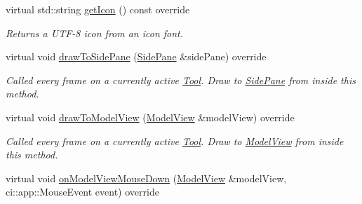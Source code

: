 \begin{DoxyCompactItemize}
\mbox{\label{classpepr3d_1_1_semiautomatic_segmentation_aa3fb6ca454b5ef25a2efacc957fdaff8}} 
virtual std\+::string \mbox{\hyperlink{classpepr3d_1_1_semiautomatic_segmentation_aa3fb6ca454b5ef25a2efacc957fdaff8}{get\+Icon}} () const override
\begin{DoxyCompactList}\small\item\em Returns a U\+T\+F-\/8 icon from an icon font. \end{DoxyCompactList}\item 
\mbox{\label{classpepr3d_1_1_semiautomatic_segmentation_a74f11046c9fe827f6be119bd6306fa0f}} 
virtual void \mbox{\hyperlink{classpepr3d_1_1_semiautomatic_segmentation_a74f11046c9fe827f6be119bd6306fa0f}{draw\+To\+Side\+Pane}} (\mbox{\hyperlink{classpepr3d_1_1_side_pane}{Side\+Pane}} \&side\+Pane) override
\begin{DoxyCompactList}\small\item\em Called every frame on a currently active \mbox{\hyperlink{classpepr3d_1_1_tool}{Tool}}. Draw to \mbox{\hyperlink{classpepr3d_1_1_side_pane}{Side\+Pane}} from inside this method. \end{DoxyCompactList}\item 
\mbox{\label{classpepr3d_1_1_semiautomatic_segmentation_a138b0b37e305c4a8d0dd4b89d7303c50}} 
virtual void \mbox{\hyperlink{classpepr3d_1_1_semiautomatic_segmentation_a138b0b37e305c4a8d0dd4b89d7303c50}{draw\+To\+Model\+View}} (\mbox{\hyperlink{classpepr3d_1_1_model_view}{Model\+View}} \&model\+View) override
\begin{DoxyCompactList}\small\item\em Called every frame on a currently active \mbox{\hyperlink{classpepr3d_1_1_tool}{Tool}}. Draw to \mbox{\hyperlink{classpepr3d_1_1_model_view}{Model\+View}} from inside this method. \end{DoxyCompactList}\item 
\mbox{\label{classpepr3d_1_1_semiautomatic_segmentation_a4c3f72008481531cc952c9d7957fb928}} 
virtual void \mbox{\hyperlink{classpepr3d_1_1_semiautomatic_segmentation_a4c3f72008481531cc952c9d7957fb928}{on\+Model\+View\+Mouse\+Down}} (\mbox{\hyperlink{classpepr3d_1_1_model_view}{Model\+View}} \&model\+View, ci\+::app\+::\+Mouse\+Event event) override

\end{DoxyCompactItemize}
